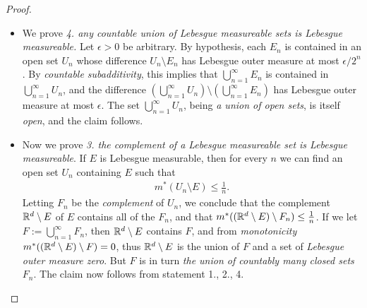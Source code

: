 \documentclass[11pt]{article}
\begin{document}
\begin{itemize}
\begin{proof}
\begin{itemize}
By outer regularity, for any $\epsilon$, there exists open $U\supset E$ such that 
\begin{align*}
m^{*}(U) &\le m^{*}(E)+ \epsilon. 
\end{align*}

Note that $U \setminus  E$ is open, so it can be decomposed into a countable collection of closed dyadic cubes $Q_{1},\cdots,$ that are \emph{almost disjoint}.  Thus
\begin{align*}
U&= E\cup \paren{\bigcup_{k=1}^{\infty}Q_{k}};\\
\text{and }m^{*}(U \setminus  E) &\le \sum_{k=1}^{\infty}\abs{Q_{k}}
\end{align*}
Since $E$ and $Q_{k}'$s are almost disjoint, 
\begin{align*}
m^{*}(U) &=  m^{*}(E) + \sum_{k=1}^{\infty}\abs{Q_{k}} \\
&\le m^{*}(E)+ \epsilon \quad (\text{by construction of }U),
\end{align*}
and $m^{*}(E)\le \infty$, so $ \sum_{k=1}^{\infty}\abs{Q_{k}} \le \epsilon \Rightarrow m^{*}(U  \setminus   E) \le \epsilon$, which complete our proof.

\item We prove \emph{4. any countable union of Lebesgue measureable sets is Lebesgue measureable.} Let $\epsilon  > 0$ be arbitrary. By hypothesis, each $E_n$ is contained in an open set $U_n$ whose difference $U_n \setminus  E_n$ has Lebesgue outer measure at most $\epsilon/2^n$. By \emph{countable subadditivity}, this implies that $\bigcup_{n=1}^{\infty}E_{n}$ is contained in $\bigcup_{n=1}^{\infty}U_{n}$, and the difference $(\bigcup_{n=1}^{\infty}U_{n}) \setminus  (\bigcup_{n=1}^{\infty}E_{n})$ has Lebesgue outer measure at most $\epsilon$. The set $\bigcup_{n=1}^{\infty}U_{n}$, being \emph{a union of open sets}, is itself \emph{open}, and the claim follows.

\item Now we prove \emph{3. the complement of a Lebesgue measureable set is Lebesgue measureable}.   If $E$ is Lebesgue measurable, then for every $n$ we can find an open set $U_n$ containing $E$ such that
\begin{align*}
m^{*}(U_n \setminus  E) \le \frac{1}{n}.
\end{align*} Letting $F_n$ be the \emph{complement} of $U_n$, we conclude that the complement ${\mathbb R}^d \setminus  E$ of $E$ contains all of the $F_n$, and that $m^{*}(({\mathbb R}^d \setminus  E) \setminus  F_n) \le \frac{1}{n}$. If we let $F := \bigcup_{n=1}^{\infty} F_n$, then ${\mathbb R}^d \setminus  E$ contains $F$, and from \emph{monotonicity} $m^{*}(({\mathbb R}^d \setminus  E) \setminus  F ) = 0$, thus ${\mathbb R}^d \setminus  E$ is the union of $F$ and a set of \emph{Lebesgue outer measure zero}. But $F$ is
in turn \emph{the union of countably many closed sets} $F_n$. The claim now follows from statement 1., 2., 4.


\end{itemize}
\end{proof}
\end{itemize}
\end{document}
